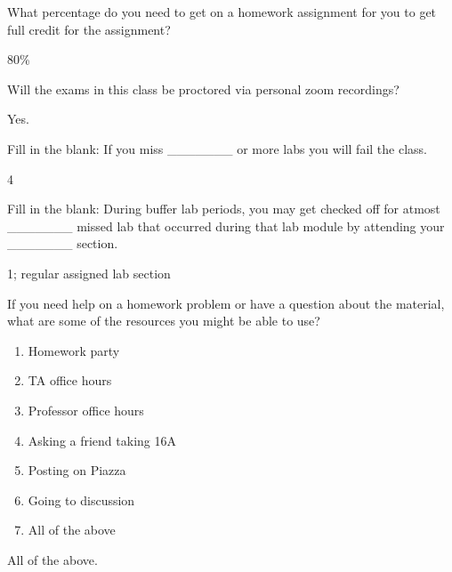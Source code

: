 \documentclass[11pt]{article}
\begin{document}
\begin{Parts}
	\Part What percentage do you need to get on a homework assignment for you to get full credit for the assignment?
	\begin{Answer}
		80\%
	\end{Answer}
	
	\Part Will the exams in this class be proctored via personal zoom recordings?
	\begin{Answer}
		Yes.
	\end{Answer}
	
	\Part Fill in the blank:
If you miss \_\_\_\_\_\_\_ or more labs you will fail the class.
	\begin{Answer}
		4
	\end{Answer}
	
	\Part Fill in the blank:
During buffer lab periods, you may get checked off for atmost \_\_\_\_\_\_\_ missed lab that occurred during that lab module by attending your \_\_\_\_\_\_\_ section.
	\begin{Answer}
		1; regular assigned lab section
	\end{Answer}
	
\end{Parts}

If you need help on a homework problem or have a question about the material, what are some of the resources you might be able to use?

\begin{enumerate}[i]
	\item Homework party 
	\item TA office hours
    \item Professor office hours
	\item Asking a friend taking 16A
    \item Posting on Piazza 
    \item Going to discussion
	\item All of the above
\end{enumerate}

\begin{Answer}
	All of the above.
\end{Answer}
\end{document}
